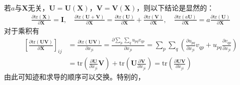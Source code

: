 \documentclass{ctexart}
\theoremstyle{definition}
\def \Iv {\mathbf{I}}
\def \Uv {\mathbf{U}}
\def \Vv {\mathbf{V}}
\def \Xv {\mathbf{X}}
\def \tr {\mathrm{tr}}
\begin{document}
若$a$与$\Xv$无关，$\Uv = \Uv(\Xv)$，$\Vv = \Vv(\Xv)$，则以下结论是显然的：
\begin{align*}
    \frac{\partial \tr(\Xv)}{\partial \Xv} = \Iv, \quad \frac{\partial \tr(\Uv+\Vv)}{\partial \Xv} = \frac{\partial \tr(\Uv)}{\partial \Xv} + \frac{\partial \tr(\Vv)}{\partial \Xv}, \quad \frac{\partial \tr(a \Uv)}{\partial \Xv} = a \frac{\partial \tr(\Uv)}{\partial \Xv}
\end{align*}
对于乘积有
\begin{align*}
    \left[ \frac{\partial \tr(\Uv \Vv)}{\partial \Xv} \right]_{ij} & = \frac{\partial \tr(\Uv \Vv)}{\partial x_{ji}} = \frac{\partial \sum_p \sum_q u_{pq} v_{qp}}{\partial x_{ji}} = \sum_p \sum_q \left( \frac{\partial u_{pq}}{\partial x_{ji}} v_{qp} + u_{pq} \frac{\partial v_{qp}}{\partial x_{ji}} \right) \\
                                                                   & = \tr \left( \frac{\partial \Uv}{\partial x_{ji}} \Vv \right) + \tr \left( \Uv \frac{\partial \Vv}{\partial x_{ji}} \right) = \tr \left( \frac{\partial \Uv \Vv}{\partial x_{ji}} \right)
\end{align*}
由此可知迹和求导的顺序可以交换。特别的，
\end{document}
